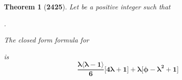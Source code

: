 \documentclass[preview]{standalone}
\newtheorem{theorem}{Theorem}
\begin{document}
\begin{theorem}[\textbf{2425}]
    
    \raggedright Let \bm{$\phi$} be a positive integer such that
    \raggedright \bm{$\lfloor \sqrt \phi \rfloor = \lambda$}.
    \raggedright The closed form formula for 
    \raggedright {} 
    is 
    \begin{equation*}
        \bm{
            \frac{
                \lambda
                \big \langle \lambda - 1 \big \rangle
            }
            {6}
            \Bigg[
                4 \lambda + 1
            \Bigg]
                +
            \lambda
            \Bigg[
                \phi
                    -
                \lambda ^2
                    +
                1
            \Bigg]
        }
    \end{equation*}
\end{theorem}
\end{document}

